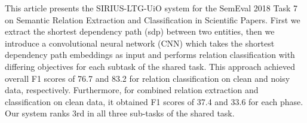 This article presents the SIRIUS-LTG-UiO system for the SemEval 2018 Task 7 on Semantic Relation Extraction and Classification in Scientific Papers. First we extract the shortest dependency path (sdp) between two entities, then we introduce a convolutional neural network (CNN) which takes the shortest dependency path embeddings as input and performs relation classification with differing objectives for each subtask of the shared task. This approach achieved overall F1 scores of 76.7 and 83.2 for relation classification on clean and noisy data, respectively. Furthermore, for combined relation extraction and classification on clean data, it obtained F1 scores of 37.4 and 33.6 for each phase. Our system ranks 3rd in all three sub-tasks of the shared task.
